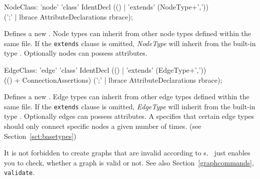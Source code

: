 \begin{rail}
  NodeClass: 'node' 'class' IdentDecl (() | 'extends' (NodeType+',')) \\
    (';' | lbrace AttributeDeclarations rbrace);
\end{rail}
Defines a new . Node types can inherit from other node types defined within the same file. If the \texttt{extends} clause is omitted, \emph{NodeType} will inherit from the built-in type \texttt{}. Optionally nodes can possess attributes.

\begin{rail}
  EdgeClass: 'edge' 'class' IdentDecl (() | 'extends' (EdgeType+',')) \\
    (() + ConnectionAssertions) (';' | lbrace AttributeDeclarations rbrace);
\end{rail}
Defines a new .
Edge types can inherit from other edge types defined within the same file.
If the \texttt{extends} clause is omitted, \emph{EdgeType} will inherit from the built-in type \texttt{}.
Optionally edges can possess attributes.
A  specifies that certain edge types should only connect specific nodes a given number of times.
(see Section~\ref{sct:basetypes})

\begin{warning}
It is not forbidden to create graphs that are invalid according to s.
\GrG\ just enables you to check, whether a graph is valid or not.
See also Section~\ref{graphcommands}, \texttt{validate}.
\end{warning}

